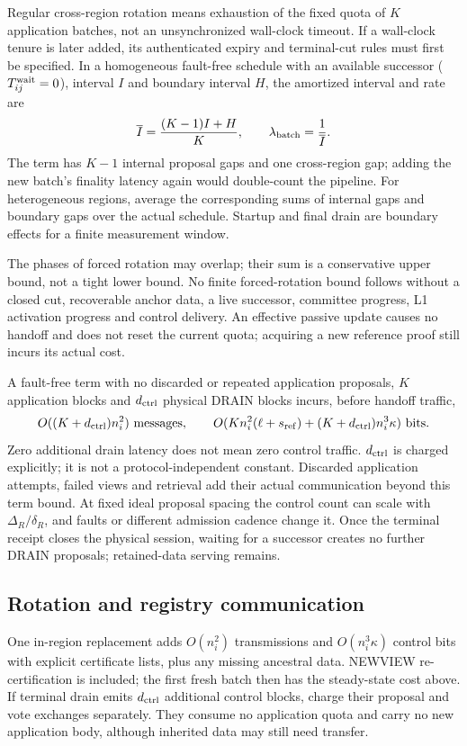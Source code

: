 \documentclass[11pt,a4paper,onecolumn]{article}
\newcounter{protocol}
\begin{document}
Regular cross-region rotation means exhaustion of the fixed quota of $K$ application
batches, not an unsynchronized wall-clock timeout. If a wall-clock tenure
is later added, its authenticated expiry and terminal-cut rules must first
be specified. In a homogeneous fault-free schedule with an available successor
($T_{ij}^{\rm wait}=0$), interval $I$ and boundary interval $H$, the amortized interval and rate are
\[
 \overline I=\frac{(K-1)I+H}{K},
 \qquad \lambda_{\rm batch}=\frac{1}{\overline I}.
\]
The term has $K-1$ internal proposal gaps and one cross-region gap; adding
the new batch's finality latency again would double-count the pipeline.
For heterogeneous regions, average the corresponding sums of internal
gaps and boundary gaps over the actual schedule. Startup and final drain
are boundary effects for a finite measurement window.

The phases of forced rotation may overlap; their sum is a conservative upper
bound, not a tight lower bound. No finite forced-rotation bound
follows without a closed cut, recoverable anchor data, a live successor,
committee progress, L1 activation progress and control delivery. An
effective passive update causes no handoff and does not reset the current
quota; acquiring a new reference proof still incurs its actual cost.

A fault-free term with no discarded or repeated application proposals,
$K$ application blocks and $d_{\rm ctrl}$ physical DRAIN blocks incurs,
before handoff traffic,
\[
 O((K+d_{\rm ctrl})n_i^2)\ \text{messages},\qquad
 O(Kn_i^2(\ell+s_{\rm ref})+(K+d_{\rm ctrl})n_i^3\kappa)\ \text{bits}.
\]
Zero additional drain latency does not mean zero control traffic.
$d_{\rm ctrl}$ is charged explicitly; it is not a protocol-independent
constant. Discarded application attempts, failed views and retrieval add
their actual communication beyond this term bound. At fixed ideal proposal
spacing the control count can scale with
$\Delta_R/\delta_R$, and faults or different admission cadence change it.
Once the terminal receipt closes the physical session, waiting for a
successor creates no further DRAIN proposals; retained-data serving remains.

\subsection{Rotation and registry communication}
One in-region replacement adds $O(n_i^2)$ transmissions and
$O(n_i^3\kappa)$ control bits with explicit certificate lists, plus any
missing ancestral data. NEWVIEW re-certification is included; the first
fresh batch then has the steady-state cost above. If terminal drain emits
$d_{\rm ctrl}$ additional control blocks, charge their proposal and vote exchanges
separately. They consume no application quota and carry no new application
body, although inherited data may still need transfer.
\end{document}
